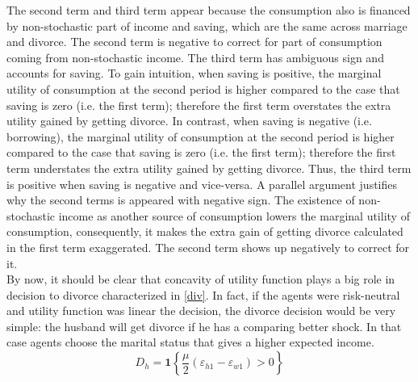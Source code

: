 The second term and third term appear because the consumption also is financed by non-stochastic part of income and saving, which are the same across marriage and divorce. The second term is negative to correct for part of consumption coming from non-stochastic income. The third term has ambiguous sign and accounts for saving. To gain intuition, when saving is positive, the marginal utility of consumption at the second period is higher compared to the case that saving is zero (i.e. the first term); therefore the first term overstates the extra utility gained by getting divorce. In contrast, when saving is negative (i.e. borrowing), the marginal utility of consumption at the second period is higher compared to the case that saving is zero (i.e. the first term); therefore the first term understates the extra utility gained by getting divorce. Thus, the third term is positive when saving is negative and vice-versa. A parallel argument justifies why the second terms is appeared with negative sign. The existence of non-stochastic income as another source of consumption lowers the marginal utility of consumption, consequently, it makes the extra gain of getting divorce calculated in the first term exaggerated. The second term shows up negatively to correct for it.  \\

By now, it should be clear that concavity of utility function plays a big role in decision to divorce characterized in  \eqref{div}. In fact, if the agents were risk-neutral and utility function was linear the decision, the divorce decision would be very simple: the husband will get divorce if he has a comparing better shock. In that case agents choose the marital status that gives a higher expected income. \\

\begin{equation*}
D_h = \mathbf 1 \left \{ \dfrac{\mu}{2} (\varepsilon_{h1} - \varepsilon_{w1}) > 0\right\}
\end{equation*}

